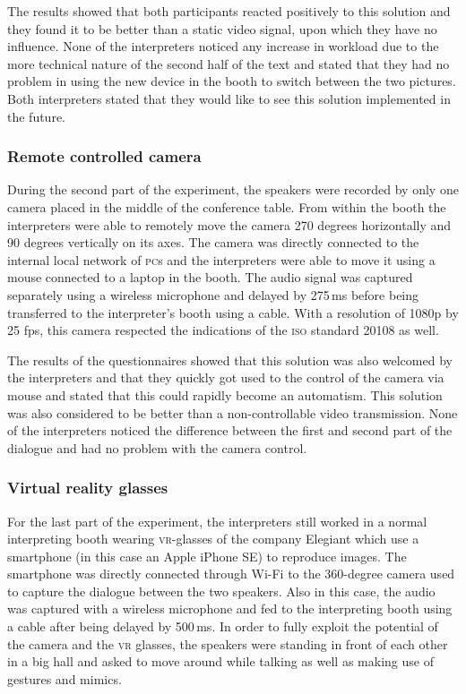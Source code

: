 \documentclass[output=paper]{langsci/langscibook}
\begin{document}
The results showed that both participants reacted positively to this solution and they found it to be better than a static video signal, upon which they have no influence. None of the interpreters noticed any increase in workload due to the more technical nature of the second half of the text and stated that they had no problem in using the new device in the booth to switch between the two pictures. Both interpreters stated that they would like to see this solution implemented in the future.

\subsubsection{Remote controlled camera}

During the second part of the experiment, the speakers were recorded by only one camera placed in the middle of the conference table. From within the booth the interpreters were able to remotely move the camera 270 degrees horizontally and 90 degrees vertically on its axes. The camera was directly connected to the internal local network of \textsc{pc}s and the interpreters were able to move it using a mouse connected to a laptop in the booth. The audio signal was captured separately using a wireless microphone and delayed by 275\,ms before being transferred to the interpreter’s booth using a cable. With a resolution of 1080p by 25 fps, this camera respected the indications of the \textsc{iso} standard 20108 as well. 

The results of the questionnaires showed that this solution was also welcomed by the interpreters and that they quickly got used to the control of the camera via mouse and stated that this could rapidly become an automatism. This solution was also considered to be better than a non-controllable video transmission. None of the interpreters noticed the difference between the first and second part of the dialogue and had no problem with the camera control.

\subsubsection{Virtual reality glasses}

For the last part of the experiment, the interpreters still worked in a normal interpreting booth wearing \textsc{vr}-glasses of the company Elegiant which use a smartphone (in this case an Apple iPhone SE) to reproduce images. The smartphone was directly connected through Wi-Fi to the 360-degree camera used to capture the dialogue between the two speakers. Also in this case, the audio was captured with a wireless microphone and fed to the interpreting booth using a cable after being delayed by 500\,ms. In order to fully exploit the potential of the camera and the \textsc{vr} glasses, the speakers were standing in front of each other in a big hall and asked to move around while talking as well as making use of gestures and mimics.
\end{document}
